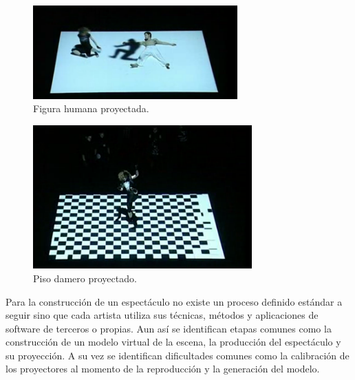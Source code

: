\begin{minipage}{0.50\textwidth}
\begin{flushleft} \large
\begin{figure}[H]
  \centering
    \includegraphics[width=0.7\textwidth]{./Cap1_intro/instalacionHumano1.png}
  \caption[http://vimeo.com/2774865]{Figura humana proyectada.}
  \label{fig:instalacionHumano1}
\end{figure}
\end{flushleft}
\end{minipage}
\begin{minipage}{0.50\textwidth}
\begin{flushright} \large
\begin{figure}[H]
  \centering
    \includegraphics[width=0.75\textwidth]{./Cap1_intro/instalacionHumano4.png}
  \caption[http://vimeo.com/2774865]{Piso damero proyectado.}
  \label{fig:instalacionHumano2}
\end{figure}
\end{flushright}
\end{minipage}

Para la construcción de un espectáculo no existe un proceso definido estándar a seguir sino que cada artista utiliza sus técnicas, métodos y aplicaciones de software de terceros o propias. Aun así se identifican etapas comunes como la construcción de un modelo virtual de la escena, la producción del espectáculo y su proyección. A su vez se identifican dificultades comunes como la calibración de los proyectores al momento de la reproducción y la generación del modelo.

